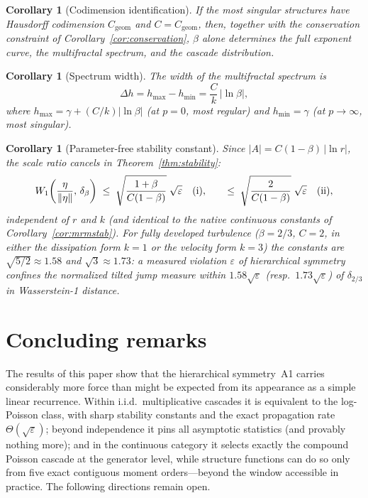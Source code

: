 \documentclass[pdflatex,sn-mathphys-num]{sn-jnl}
\theoremstyle{thmstyleone}
\newtheorem{corollary}[theorem]{Corollary}
\theoremstyle{thmstyletwo}
\theoremstyle{thmstylethree}
\begin{document}
\begin{corollary}[Codimension identification]\label{cor:codimension}
If the most singular structures have Hausdorff codimension
$C_{\mathrm{geom}}$ and $C = C_{\mathrm{geom}}$, then, together
with the conservation constraint of
Corollary~\ref{cor:conservation}, $\beta$
alone determines the full exponent curve, the multifractal spectrum,
and the cascade distribution.
\end{corollary}

\begin{corollary}[Spectrum width]\label{cor:width}
The width of the multifractal spectrum is
\[
  \Delta h = h_{\max} - h_{\min} = \frac{C}{k}\,|\ln\beta|,
\]
where $h_{\max} = \gamma + (C/k)|\ln\beta|$ (at $p = 0$, most
regular) and $h_{\min} = \gamma$ (at $p \to \infty$, most singular).
\end{corollary}

\begin{corollary}[Parameter-free stability constant]\label{cor:constant}
Since $|A| = C(1-\beta)\,|\ln r|$, the scale ratio cancels in
Theorem~\textup{\ref{thm:stability}}:
\[
  W_1\!\left(\frac{\eta}{\|\eta\|},\,\delta_\beta\right)
  \;\le\; \sqrt{\frac{1+\beta}{C(1-\beta)}}\;\sqrt{\varepsilon}
  \quad\textup{(i)},
  \qquad
  \le\; \sqrt{\frac{2}{C(1-\beta)}}\;\sqrt{\varepsilon}
  \quad\textup{(ii)},
\]
independent of $r$ and $k$ (and identical to the native continuous
constants of Corollary~\ref{cor:mrmstab}).  For fully developed
turbulence ($\beta = 2/3$, $C = 2$, in either the dissipation form
$k=1$ or the velocity form $k=3$) the constants are $\sqrt{5/2}
\approx 1.58$ and $\sqrt{3} \approx 1.73$: a measured violation
$\varepsilon$ of hierarchical symmetry confines the normalized
tilted jump measure within $1.58\sqrt{\varepsilon}$
(resp.\ $1.73\sqrt{\varepsilon}$) of $\delta_{2/3}$ in
Wasserstein-1 distance.
\end{corollary}


\section{Concluding remarks}
\label{sec:discussion}

The results of this paper show that the hierarchical symmetry~A1
carries considerably more force than might be expected from its
appearance as a simple linear recurrence.  Within i.i.d.\
multiplicative cascades it is equivalent to the log-Poisson class,
with sharp stability constants and the exact propagation rate
$\Theta(\sqrt\varepsilon)$; beyond independence it pins all
asymptotic statistics (and provably nothing more); and in the
continuous category it selects exactly the compound Poisson
cascade at the generator level, while structure functions can do so
only from five exact contiguous moment orders---beyond the window
accessible in practice.  The following directions remain
open.
\end{document}
